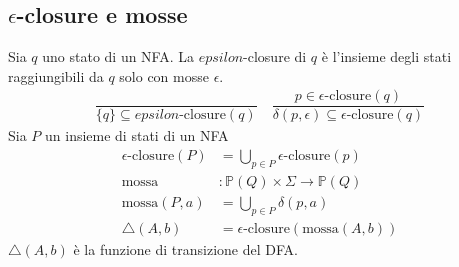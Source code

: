 \documentclass[a4paper,12pt]{article}
\begin{document}
\subsection{$\epsilon$-closure e mosse}
Sia $q$ uno stato di un NFA. La $epsilon$-closure di $q$ è l'insieme degli stati raggiungibili da $q$ solo con mosse $\epsilon$.
\begin{align*}
\dfrac{}{\{q\} \subseteq epsilon\text{-closure}(q)} \quad \dfrac{p \in \epsilon\text{-closure}(q)}{\delta(p, \epsilon) \subseteq \epsilon\text{-closure}(q)}
\end{align*}
Sia $P$ un insieme di stati di un NFA 
\begin{align*}
\epsilon\text{-closure}(P) &= \bigcup_{p \in P} \epsilon\text{-closure}(p) \\
\text{mossa} &: \mathbb{P}(Q) \times \Sigma \to \mathbb{P}(Q) \\
\text{mossa} (P, a) &= \bigcup_{p \in P} \delta(p, a) \\
\triangle(A, b) &= \epsilon\text{-closure}(\text{mossa}(A, b))
\end{align*}
$\triangle(A, b)$ è la funzione di transizione del DFA.
\end{document}
